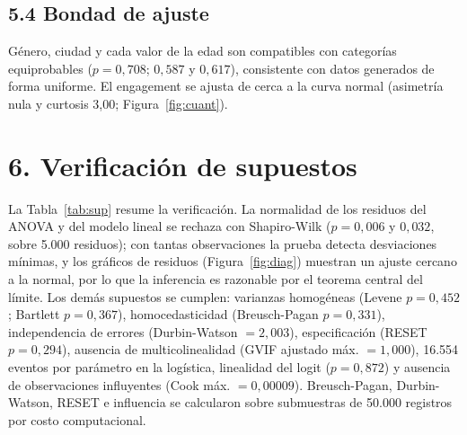\documentclass[a4,11pt]{aleph-notas}
\begin{document}
\subsection*{5.4 Bondad de ajuste}
Género, ciudad y cada valor de la edad son compatibles con categorías equiprobables ($p=0{,}708$; $0{,}587$ y $0{,}617$), consistente con datos generados de forma uniforme. El engagement se ajusta de cerca a la curva normal (asimetría nula y curtosis 3,00; Figura~\ref{fig:cuant}).



\section*{6. Verificación de supuestos}
La Tabla~\ref{tab:sup} resume la verificación. La normalidad de los residuos del ANOVA y del modelo lineal se rechaza con Shapiro-Wilk ($p=0{,}006$ y $0{,}032$, sobre 5.000 residuos); con tantas observaciones la prueba detecta desviaciones mínimas, y los gráficos de residuos (Figura~\ref{fig:diag}) muestran un ajuste cercano a la normal, por lo que la inferencia es razonable por el teorema central del límite. Los demás supuestos se cumplen: varianzas homogéneas (Levene $p=0{,}452$; Bartlett $p=0{,}367$), homocedasticidad (Breusch-Pagan $p=0{,}331$), independencia de errores (Durbin-Watson $=2{,}003$), especificación (RESET $p=0{,}294$), ausencia de multicolinealidad (GVIF ajustado máx. $=1{,}000$), 16.554 eventos por parámetro en la logística, linealidad del logit ($p=0{,}872$) y ausencia de observaciones influyentes (Cook máx. $=0{,}00009$). Breusch-Pagan, Durbin-Watson, RESET e influencia se calcularon sobre submuestras de 50.000 registros por costo computacional.
\end{document}

